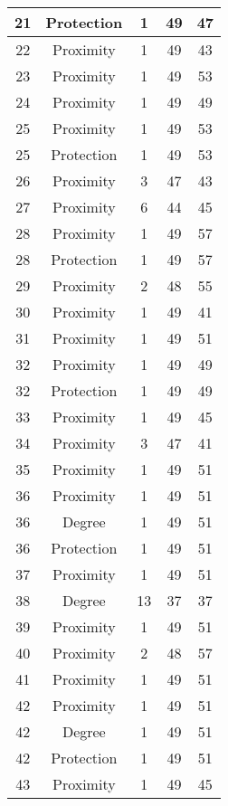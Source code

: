 \documentclass[results.tex]{subfiles}
\begin{document}
\begin{center}
\begin{tabular}{| c || c | c | c | c |}
    \hline
    21 & Protection & 1 & 49 & 47 \\ 
    \hline
    22 & Proximity & 1 & 49 & 43 \\ 
    \hline
    23 & Proximity & 1 & 49 & 53 \\ 
    \hline
    24 & Proximity & 1 & 49 & 49 \\ 
    \hline
    25 & Proximity & 1 & 49 & 53 \\ 
    \hline
    25 & Protection & 1 & 49 & 53 \\ 
    \hline
    26 & Proximity & 3 & 47 & 43 \\ 
    \hline
    27 & Proximity & 6 & 44 & 45 \\ 
    \hline
    28 & Proximity & 1 & 49 & 57 \\ 
    \hline
    28 & Protection & 1 & 49 & 57 \\ 
    \hline
    29 & Proximity & 2 & 48 & 55 \\ 
    \hline
    30 & Proximity & 1 & 49 & 41 \\ 
    \hline
    31 & Proximity & 1 & 49 & 51 \\ 
    \hline
    32 & Proximity & 1 & 49 & 49 \\ 
    \hline
    32 & Protection & 1 & 49 & 49 \\ 
    \hline
    33 & Proximity & 1 & 49 & 45 \\ 
    \hline
    34 & Proximity & 3 & 47 & 41 \\ 
    \hline
    35 & Proximity & 1 & 49 & 51 \\ 
    \hline
    36 & Proximity & 1 & 49 & 51 \\ 
    \hline
    36 & Degree & 1 & 49 & 51 \\ 
    \hline
    36 & Protection & 1 & 49 & 51 \\ 
    \hline
    37 & Proximity & 1 & 49 & 51 \\ 
    \hline
    38 & Degree & 13 & 37 & 37 \\ 
    \hline
    39 & Proximity & 1 & 49 & 51 \\ 
    \hline
    40 & Proximity & 2 & 48 & 57 \\ 
    \hline
    41 & Proximity & 1 & 49 & 51 \\ 
    \hline
    42 & Proximity & 1 & 49 & 51 \\ 
    \hline
    42 & Degree & 1 & 49 & 51 \\ 
    \hline
    42 & Protection & 1 & 49 & 51 \\ 
    \hline
    43 & Proximity & 1 & 49 & 45 \\ 

\end{tabular}
\end{center}
\end{document}
